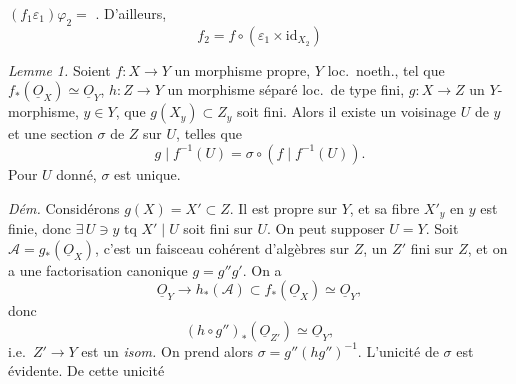 \documentclass[11pt,a4paper]{article}
\begin{document}
\struck{\ill{} \ill{} \ill{} \ill{}}
 $(f_1 \varepsilon_1)\varphi_2 = $  \ill{} \ill{} \ill{} \ill{}. D'ailleurs,  \ill{} \ill{} \ill{} \ill{} \ill{} \ill{} \ill{} \ill{} \ill{} \ill{} \ill{} \ill{}
\[
  f_2 = f \circ (\varepsilon_1 \times \mathrm{id}_{X_2})
\]


\emph{Lemme 1.} Soient $f \colon X \to Y$ un morphisme propre, $Y$ loc.\ noeth., tel que $f_*(\underline{O}_X) \simeq \underline{O}_Y$,   $h \colon Z \to Y$ un morphisme séparé loc.\ de type fini,  $g \colon X \to Z$ un $Y$-morphisme, \struck{\ill{}} $y \in Y$,  que $g(X_y) \subset Z_y$ soit fini. Alors il existe un  voisinage $U$ de $y$ et une section $\sigma$ de $Z$ sur $U$, telles que
\[
  g \mid f^{-1}(U) = \sigma \circ (f \mid f^{-1}(U)) .
\]
Pour $U$ donné, $\sigma$ est unique.


\emph{Dém.} Considérons $g(X) = X' \subset Z$. Il est propre sur $Y$, et sa fibre $X'_y$ en $y$ est finie, donc $\exists\, U \ni y$ tq $X' \mid U$ soit fini sur $U$. On peut supposer $U = Y$. Soit $\mathcal{A} = g_*(\underline{O}_X)$, c'est un faisceau cohérent d'algèbres sur $Z$,  un $Z'$ fini sur $Z$, et on a une factorisation canonique $g = g'' g'$. On a
\[
  \underline{O}_Y \to h_*(\mathcal{A}) \subset f_*(\underline{O}_X) \simeq \underline{O}_Y ,
\]
donc
\[
  (h \circ g'')_*(\underline{O}_{Z'}) \simeq \underline{O}_Y ,
\]
i.e.\ $Z' \to Y$ est un \emph{isom.} On prend alors $\sigma = g''(h g'')^{-1}$. L'unicité de $\sigma$ est évidente. De cette unicité \ill{} \ill{}


\end{document}
